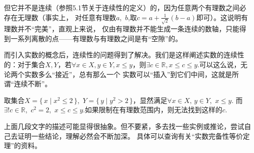 但它并不是连续（参照5.1节关于连续性的定义）的，因为任意两个有理数之间必存在无理数（事实上，
对任意有理数$a$,~$b$,取$c=a+\frac{1}{\sqrt{2}}(b-a)$即可）。这说明有理数并不“完美”，直观上来说，
仅由有理数并不能生成一条连续的数轴，只能得到一系列离散的点——有理数与有理数之间是有“空隙”的。


而引入实数的概念后，连续性的问题得到了解决。我们是这样阐述实数的连续性的：对于集合$X,Y$，若$\forall x\in X
    ,y\in Y,x\leqslant y$，则$\exists c\in \mathbb{R},x\leqslant c\leqslant y$.可以这么说，无论两个实数多么“接近”，总有那么一个
实数可以“插入”到它们中间，这就是所谓“连续不断”。
\begin{example}
    取集合$X=\{\, x\mid x^2\leqslant 2\,\}$,~$Y=\{\, y\mid y^2>2\,\}$，显然满足$\forall x\in X,\,y\in Y$,~$x\leqslant y$.
    而$\exists ! c\in \mathbb{R}$,~$c^2=2$,~$x\leqslant c\leqslant y$.如果限制在有理数范围内，则无法找到这样的$c$.%
\end{example}


上面几段文字的描述可能显得很抽象。但不要紧，多去找一些实例或推论，尝试自己去证明一些结论，理解必然会不断加深。
具体可以查询有关“实数完备性等价定理”的资料。

% 